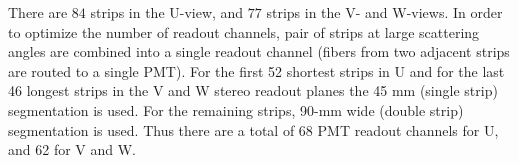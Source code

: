There are $84$ strips in the U-view, and $77$ strips in the V- and W-views. In order to optimize the number of readout channels, pair of strips at large scattering angles are combined into a single readout channel (fibers from two adjacent strips are routed to a single PMT).  For the first 52 shortest strips in U and for the last 46 longest strips in the V and W stereo readout planes the 45 mm (single strip) segmentation is used. For the
remaining strips, 90-mm wide (double strip) segmentation is used.  Thus there are a total of 68 PMT readout channels for U, and 62 for V and W.




